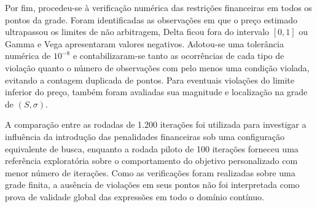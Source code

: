 Por fim, procedeu-se à verificação numérica das restrições financeiras em todos os pontos da grade. Foram identificadas as observações em que o preço estimado ultrapassou os limites de não arbitragem, Delta ficou fora do intervalo $[0,1]$ ou Gamma e Vega apresentaram valores negativos. Adotou-se uma tolerância numérica de $10^{-8}$ e contabilizaram-se tanto as ocorrências de cada tipo de violação quanto o número de observações com pelo menos uma condição violada, evitando a contagem duplicada de pontos. Para eventuais violações do limite inferior do preço, também foram avaliadas sua magnitude e localização na grade de $(S,\sigma)$.

A comparação entre as rodadas de 1.200 iterações foi utilizada para investigar a influência da introdução das penalidades financeiras sob uma configuração equivalente de busca, enquanto a rodada piloto de 100 iterações forneceu uma referência exploratória sobre o comportamento do objetivo personalizado com menor número de iterações. Como as verificações foram realizadas sobre uma grade finita, a ausência de violações em seus pontos não foi interpretada como prova de validade global das expressões em todo o domínio contínuo.

